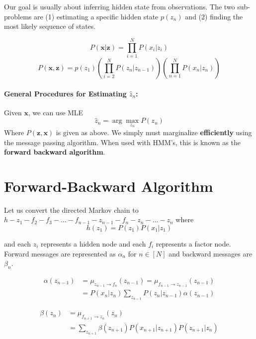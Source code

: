 \documentclass[a4paper,12pt]{report}
\begin{document}
Our goal is usually about inferring hidden state from observations. The two sub-problems are (1) estimating a specific hidden state $p(z_n)$ and (2) finding the most likely sequence of states.

\begin{equation}
P(\pmb x | \pmb z) = \prod_{i = 1}^N P(x_i | z_i)
\end{equation}
\begin{equation}
P(\pmb x, \pmb z) = p(z_1) (\prod_{i = 2}^N P(z_n | z_{n-1})) (\prod_{n=1}^N P(x_n | z_n))
\end{equation}


\paragraph{General Procedures for Estimating $\hat z_n$: } Given $\pmb x$, we can use MLE
\begin{equation}
\hat z_n = \arg\max_{z_n} P(z_n)
\end{equation}
Where $P(\pmb z, \pmb x)$ is given as above. We simply must marginalize \textbf{efficiently} using the message passing algorithm. When used with HMM's, this is known as the \textbf{forward backward algorithm}.

\section{Forward-Backward Algorithm}

Let us convert the directed Markov chain to $h - z_1 - f_2 - f_3 - \dots - f_{n-1} - z_{n-1} - f_n - z_n - \dots - z_n$ where 
\begin{equation}
h(z_1) = P(z_1)P(x_1 | z_1)
\end{equation}

and each $z_i$ represents a hidden node and each $f_i$ represents a factor node. Forward messages are represented as $\alpha_n$ for $n\in [N]$ and backward messages are $\beta_n$.

\begin{equation}
\begin{split}
\alpha(z_{n-1}) &= \mu_{z_{n-1}\to f_n}(z_{n-1}) = \mu_{f_{n-1} \to z_{n-1}}(z_{n-1}) \\
&= P(x_n | z_n) \sum_{z_{n-1}}^{} P(z_n | z_{n-1}) \alpha(z_{n-1})
\end{split}
\end{equation}

\begin{equation}
\begin{split}
\beta(z_n) &= \mu_{f_{n+1}\to z_{n}}(z_n) \\
&= \sum_{z_{n+1}}^{} \beta(z_{n+1})P(x_{n+1} | z_{n+1}) P(z_{n+1} | z_n)
\end{split}
\end{equation}
\end{document}
